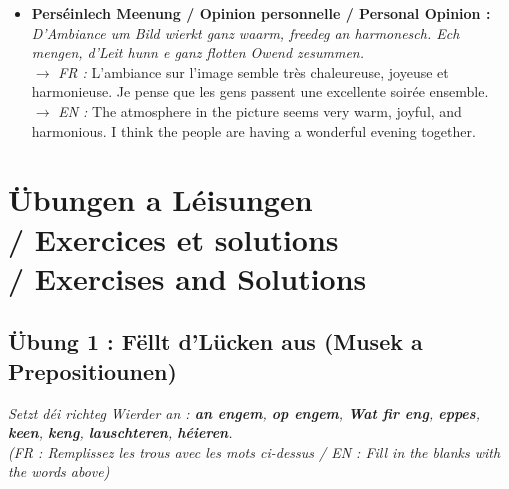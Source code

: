 \begin{itemize}
    \vspace{0.3em}

    \item \textbf{Perséinlech Meenung / Opinion personnelle / Personal Opinion :} \\
    \textit{D'Ambiance um Bild wierkt ganz waarm, freedeg an harmonesch. Ech mengen, d'Leit hunn e ganz flotten Owend zesummen.} \\
    $\rightarrow$ \textit{FR :} L'ambiance sur l'image semble très chaleureuse, joyeuse et harmonieuse. Je pense que les gens passent une excellente soirée ensemble. \\
    $\rightarrow$ \textit{EN :} The atmosphere in the picture seems very warm, joyful, and harmonious. I think the people are having a wonderful evening together.
\end{itemize}

\vspace{1.5em}

\section[Übungen a Léisungen / Exercises and Solutions]{Übungen a Léisungen \\/ Exercices et solutions \\/ Exercises and Solutions}

\subsection*{Übung 1 : Fëllt d'Lücken aus (Musek a Prepositiounen)}
\textit{Setzt déi richteg Wierder an : \textbf{an engem}, \textbf{op engem}, \textbf{Wat fir eng}, \textbf{eppes}, \textbf{keen}, \textbf{keng}, \textbf{lauschteren}, \textbf{héieren}.} \\
\textit{\small(FR : Remplissez les trous avec les mots ci-dessus / EN : Fill in the blanks with the words above)}

